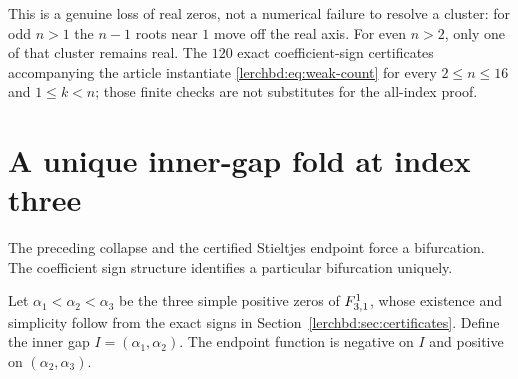 This is a genuine loss of real zeros, not a numerical failure to resolve a cluster: for odd $n>1$ the $n-1$ roots near $1$ move off the real axis. For even $n>2$, only one of that cluster remains real. The $120$ exact coefficient-sign certificates accompanying the article instantiate \eqref{lerchbd:eq:weak-count} for every $2\le n\le16$ and $1\le k<n$; those finite checks are not substitutes for the all-index proof.

\section{A unique inner-gap fold at index three}\label{lerchbd:sec:fold}
The preceding collapse and the certified Stieltjes endpoint force a bifurcation. The coefficient sign structure identifies a particular bifurcation uniquely.

Let $\alpha_1<\alpha_2<\alpha_3$ be the three simple positive zeros of $F_{3,1}^{1}$, whose existence and simplicity follow from the exact signs in Section~\ref{lerchbd:sec:certificates}. Define the inner gap $I=(\alpha_1,\alpha_2)$. The endpoint function is negative on $I$ and positive on $(\alpha_2,\alpha_3)$.

